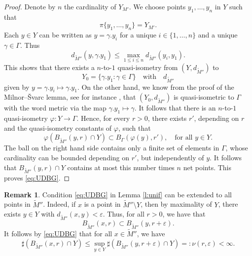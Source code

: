 \documentclass[10pt,letterpaper]{amsart}
\theoremstyle{definition}
\newtheorem{remark}[thm]{Remark}
\numberwithin{thm}{subsection}
\numberwithin{equation}{section}
\begin{document}
\begin{proof}
Denote by $n$ the cardinality of $Y_{M'}$. We choose points $y_1,\ldots,y_n$ in $Y$ such that
\begin{displaymath}
\pi \{y_1,\ldots,y_n\}=Y_{M'}.
\end{displaymath}
Each $y\in Y$ can be written as $y =\gamma . y_i$ for a unique $i\in \{1,\ldots,n\}$ and a unique $\gamma \in \Gamma$. Thus
\begin{displaymath}
d_{\widetilde{M}''}(y,\gamma .y_1)\leq \max_{1\leq i\leq n} d_{\widetilde{M}''}(y_i,y_1).
\end{displaymath}
This shows that  there exists a $n$-to-$1$ quasi-isometry from $(Y,d_{\widetilde{M}''})$ to
\begin{displaymath}
Y_0 = \{\gamma. y_1: \gamma \in \Gamma\} \quad\text{with}\quad d_{\widetilde{M}''}
\end{displaymath}
given by $y = \gamma. y_i \mapsto \gamma. y_1$. On the other hand,
we know from the proof of the Milnor--\v{S}varc lemma, see for
instance \cite[Theorem 1.18]{MR2007488}, that
$(Y_0,d_{\widetilde{M}''})$ is quasi-isometric to $\Gamma$ with
the word metric via the map $\gamma.y_1 \mapsto \gamma$. It
follows that there is an $n$-to-$1$ quasi-isometry $\varphi: Y \to
\Gamma$. Hence, for every $r>0$, there exists $r'$, depending on
$r$ and the quasi-isometry constants of $\varphi$, such that
\begin{displaymath}
\varphi \left(B_{\widetilde{M}''}(y,r)\cap Y \right) \subset B_{\Gamma}(\varphi(y),r'),\quad \text{for all }y\in Y.
\end{displaymath}
The ball on the right hand side contains only a finite set of elements in $\Gamma$, whose cardinality can be bounded  depending on $r'$, but independently of $y$. It follows that $B_{\widetilde{M}''}(y,r)\cap Y$ contains at most this number times $n$ net points. This proves \eqref{eq:UDBG}.
\end{proof}

\begin{remark}\label{rem:net_point_overlap}
Condition \eqref{eq:UDBG} in Lemma \ref{l:unif} can be extended to all points in $\widetilde{M}''$. Indeed, if $x$ is a point in $\widetilde{M}''\setminus Y$, then by maximality of $Y$, there exists $y\in Y$ with $d_{\widetilde{M}''}(x,y)<\varepsilon$. Thus, for all $r>0$, we have that
\begin{displaymath}
B_{\widetilde{M}''}(x,r) \subset B_{\widetilde{M}''}(y,r+\varepsilon).
\end{displaymath}
It follows by \eqref{eq:UDBG} that for all $x\in \widetilde{M}''$, we have
\begin{equation}\label{eq:Kanai(2.4)}
\sharp \left(B_{\widetilde{M}''}(x,r) \cap Y \right) \leq \sup_{y\in Y} \sharp \left(B_{\widetilde{M}''}(y,r+\varepsilon)\cap Y\right)=:\nu(r,\varepsilon)<\infty.
\end{equation}
\end{remark}
\end{document}
